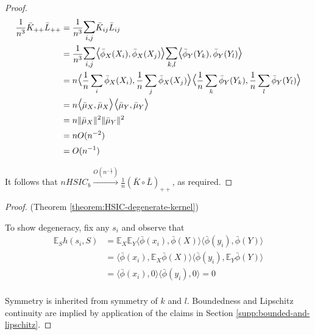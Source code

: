 \documentclass[]{article}
\begin{document}
\begin{proof}
\begin{align*}
 \frac{1}{n^3}\bar{K}_{++}\bar{L}_{++} &= \frac{1}{n^3}\mathlarger{\mathlarger{\sum}}_{i,j}\bar{K}_{ij}\bar{L}_{ij}\\
 & =  \frac{1}{n^3}\mathlarger{\mathlarger{\sum}}_{i,j}\mathlarger{\mathlarger{\langle}} \bar{\phi}_X(X_i), \bar{\phi}_X(X_j) \mathlarger{\mathlarger{\rangle}} \mathlarger{\mathlarger{\sum}}_{k,l}\mathlarger{\mathlarger{\langle}} \bar{\phi}_Y(Y_k), \bar{\phi}_Y(Y_l) \mathlarger{\mathlarger{\rangle}} \\ &
 = n\mathlarger{\mathlarger{\langle}} \frac{1}{n}\sum_i\bar{\phi}_X(X_i) , \frac{1}{n}\sum_j\bar{\phi}_X(X_j) \mathlarger{\mathlarger{\rangle}} \mathlarger{\mathlarger{\langle}} \frac{1}{n}\sum_k\bar{\phi}_Y(Y_k)  , \frac{1}{n}\sum_l\bar{\phi}_Y(Y_l) \mathlarger{\mathlarger{\rangle}}\\&
 = n \mathlarger{\mathlarger{\langle}} \bar{\mu}_X , \bar{\mu}_X \mathlarger{\mathlarger{\rangle}} \mathlarger{\mathlarger{\langle}} \bar{\mu}_Y , \bar{\mu}_Y  \mathlarger{\mathlarger{\rangle}} \\ &
= n\|\bar{\mu}_X \|^2 \|\bar{\mu}_Y \|^2\\ &= nO(n^{-2}) \\&= O(n^{-1})
\end{align*}


It follows that $nHSIC_b  \xrightarrow{O(n^{-\frac{1}{2}})} \frac{1}{n} (\bar{K}\circ \bar{L})_{++}$, as required.
\end{proof}

\begin{proof}(Theorem \ref{theorem:HSIC-degenerate-kernel})

To show degeneracy, fix any $s_i$ and observe that 
\begin{align*}
\mathbb{E}_{S}h(s_i,S) &= \mathbb{E}_X\mathbb{E}_Y \langle\bar{\phi}(x_i),\bar{\phi}(X)\rangle \langle\bar{\phi}(y_i),\bar{\phi}(Y)\rangle \\
&= \langle\bar{\phi}(x_i),\mathbb{E}_X\bar{\phi}(X)\rangle \langle\bar{\phi}(y_i),\mathbb{E}_Y\bar{\phi}(Y)\rangle \\
&= \langle\bar{\phi}(x_i),0\rangle \langle\bar{\phi}(y_i),0\rangle = 0\\
\end{align*}	

Symmetry is inherited from symmetry of $k$ and $l$. Boundedness and Lipschitz continuity are implied by application of the claims in Section \ref{supp:bounded-and-lipschitz}.

\end{proof}
\end{document}
